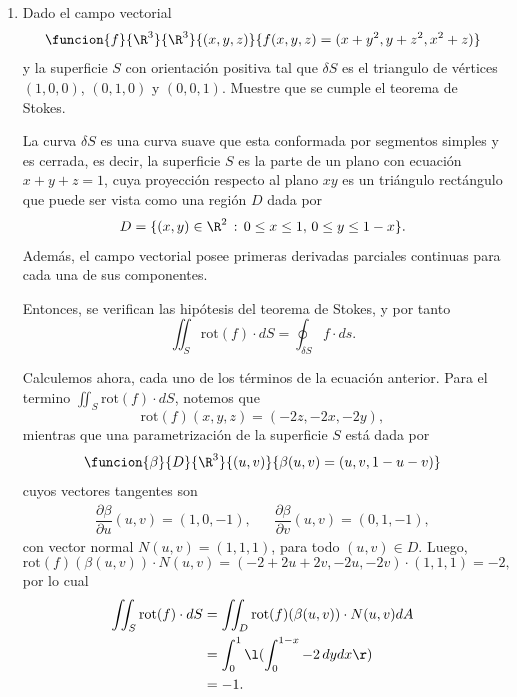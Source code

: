 \documentclass[a4,11pt]{aleph-examen}
\begin{document}
\begin{preguntas}
\begin{respuesta}
\begin{respuesta}
\begin{respuesta}
\begin{enumerate}
\item Dado el campo vectorial
    \[
    \funcion{f}{\R^3}{\R^3}
    {(x,y,z)}{f(x,y,z)=(x+y^2,y+z^2,x^2+z)}
	\]
    y la superficie $S$ con orientación positiva tal que $\delta S$ es el triangulo de vértices $(1,0,0)$, $(0,1,0)$ y $(0,0,1)$. Muestre que se cumple el teorema de Stokes.
    
\begin{respuesta}
    La curva $\delta S$ es una curva suave que esta conformada por segmentos simples y es cerrada, es decir, la superficie $S$ es la parte de un plano con ecuación $x+y+z=1$, cuya proyección respecto al plano $xy$ es un triángulo rectángulo que puede ser vista como una región $D$ dada por
    \[
    D=\{(x,y)\in\R^2\,:\,0\leq x \leq 1, \, 0 \leq y \leq 1 - x\}.
    \]
    Además, el campo vectorial posee primeras derivadas parciales continuas para cada una de sus componentes.
    
    \noindent Entonces, se verifican las hipótesis del teorema de Stokes, y por tanto
    \[
    \iint_{S}{\mbox{rot}(f)\cdot dS} = \oint_{\delta S}{f\cdot ds}.
    \]
    
    \noindent Calculemos ahora, cada uno de los términos de la ecuación anterior.     Para el termino $\iint_{S}{\mbox{rot}(f)\cdot dS}$, notemos que
    \[
    \mbox{rot}(f)(x,y,z) = (-2z,-2x,-2y),
    \]
    mientras que una parametrización de la superficie $S$ está dada por
    \[
    \funcion{\beta}{D}{\R^3}
    {(u,v)}{\beta(u,v)=(u,v,1-u-v)}
	\]
    cuyos vectores tangentes son
    \[
    \begin{array}{ccc}
    \dfrac{\partial \beta}{\partial u}(u,v) = (1,0,-1), & & \dfrac{\partial \beta}{\partial v}(u,v) = (0,1,-1),
    \end{array}
    \]
    con vector normal $N(u,v)=(1,1,1)$, para todo $(u,v)\in D$. Luego,
    \[
      \mbox{rot}(f)(\beta(u,v))\cdot N(u,v) = (-2+2u+2v,-2u,-2v)\cdot(1,1,1)=-2,
    \]
    por lo cual
    \begin{align*}
    \iint_{S}{\mbox{rot}(f)\cdot dS} &= \iint_{D}{\mbox{rot}(f)(\beta(u,v))\cdot N(u,v)dA}\\
    &= \int_{0}^{1}{\l(\int_{0}^{1-x}{-2\, dy dx}\r)}\\
    &= -1.
	\end{align*}
    

\end{respuesta}
\end{enumerate}
\end{respuesta}
\end{respuesta}
\end{respuesta}
\end{preguntas}
\end{document}
